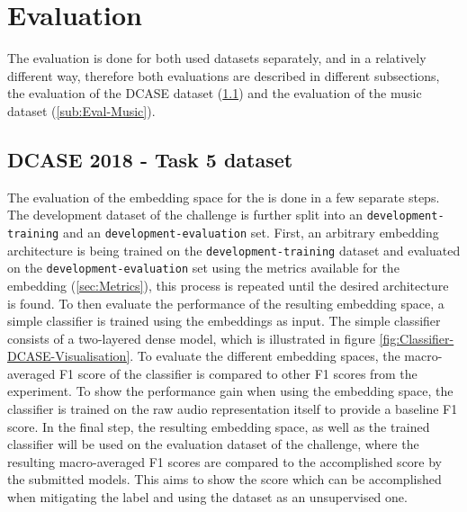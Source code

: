 \section{Evaluation}
\label{sec:Evaluation}
The evaluation is done for both used datasets separately, and in a relatively different way, therefore both evaluations are described in different subsections, the evaluation of the DCASE dataset (\ref{sub:Eval-DCASE}) and the evaluation of the music dataset (\ref{sub:Eval-Music}).

\subsection{DCASE 2018 - Task 5 dataset}
\label{sub:Eval-DCASE}
The evaluation of the embedding space for the  is done in a few separate steps. The development dataset of the challenge is further split into an \texttt{development-training} and an \texttt{development-evaluation} set. First, an arbitrary embedding architecture is being trained on the \texttt{development-training} dataset and evaluated on the \texttt{development-evaluation} set using the metrics available for the embedding (\ref{sec:Metrics}), this process is repeated until the desired architecture is found.
\newline
\newline
To then evaluate the performance of the resulting embedding space, a simple classifier is trained using the embeddings as input. The simple classifier consists of a two-layered dense model, which is illustrated in figure \ref{fig:Classifier-DCASE-Visualisation}. To evaluate the different embedding spaces, the macro-averaged F1 score of the classifier is compared to other F1 scores from the experiment. To show the performance gain when using the embedding space, the classifier is trained on the raw audio representation itself to provide a baseline F1 score.
\newline
\newline
In the final step, the resulting embedding space, as well as the trained classifier will be used on the evaluation dataset of the challenge, where the resulting macro-averaged F1 scores are compared to the accomplished score by the submitted models. This aims to show the score which can be accomplished when mitigating the label and using the dataset as an unsupervised one.


